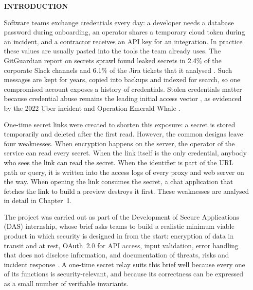 \documentclass[12pt,a4paper]{article}
\numberwithin{equation}{section}
\numberwithin{figure}{section}
\numberwithin{table}{section}
\newcommand{\unnumberedsection}[1]{%
  \clearpage
  \phantomsection
  \addcontentsline{toc}{section}{#1}
  \begin{center}
    {\fontsize{13pt}{16pt}\bfseries\MakeUppercase{#1}\par}
  \end{center}
  \vspace{14pt}
}
\begin{document}
\clearpage
\pagestyle{fancy}

\unnumberedsection{INTRODUCTION}

Software teams exchange credentials every day: a developer needs a database password during onboarding, an operator shares a temporary cloud token during an incident, and a contractor receives an API key for an integration. In practice these values are usually pasted into the tools the team already uses. The GitGuardian report on secrets sprawl found leaked secrets in 2.4\% of the corporate Slack channels and 6.1\% of the Jira tickets that it analysed \cite{gitguardian2025}. Such messages are kept for years, copied into backups and indexed for search, so one compromised account exposes a history of credentials. Stolen credentials matter because credential abuse remains the leading initial access vector \cite{verizon2025}, as evidenced by the 2022 Uber incident \cite{uber2022} and Operation Emerald Whale \cite{emeraldwhale2024}.

One-time secret links were created to shorten this exposure: a secret is stored temporarily and deleted after the first read. However, the common designs leave four weaknesses. When encryption happens on the server, the operator of the service can read every secret. When the link itself is the only credential, anybody who sees the link can read the secret. When the identifier is part of the URL path or query, it is written into the access logs of every proxy and web server on the way. When opening the link consumes the secret, a chat application that fetches the link to build a preview destroys it first. These weaknesses are analysed in detail in Chapter~1.

The project was carried out as part of the Development of Secure Applications (DAS) internship, whose brief asks teams to build a realistic minimum viable product in which security is designed in from the start: encryption of data in transit and at rest, OAuth~2.0 for API access, input validation, error handling that does not disclose information, and documentation of threats, risks and incident response \cite{dasbrief}. A one-time secret relay suits this brief well because every one of its functions is security-relevant, and because its correctness can be expressed as a small number of verifiable invariants.
\end{document}
